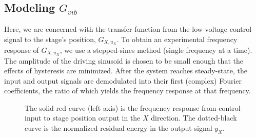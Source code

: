 \documentclass[journal,twocolumn,twoside]{IEEEtran}
\begin{document}
\subsection{Modeling $G_{vib}$}\label{sec:vib_model}
Here, we are concerned with the transfer function from the low voltage control signal to the stage's position, $G_{X,u_X}$. To obtain an experimental frequency response of $G_{X,u_X}$, we use a stepped-sines method (single frequency at a time). The amplitude of the driving sinusoid is chosen to be small enough that the effects of hysteresis are minimized. After the system reaches steady-state, the input and output signals are demodulated into their first (complex) Fourier coefficients, the ratio of which yields the frequency response at that frequency.

\begin{figure}
  \centering
  
  \caption{The solid red curve (left axis) is the frequency response from control input to stage position output in the $X$ direction. The dotted-black curve is the normalized residual energy in the output signal $y_X$.}
  \label{fig:Guz2stage_frf}
\end{figure}
\end{document}
